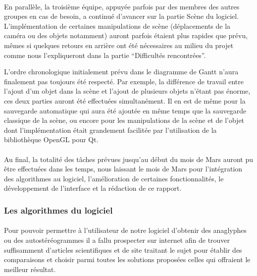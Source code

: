 \paragraph{}
En parallèle, la troisième équipe, appuyée parfois par des membres des autres groupes en cas de besoin, a continué d'avancer sur la partie Scène du logiciel. L'implémentation de certaines manipulations de scène (déplacements de la caméra ou des objets notamment) auront parfois étaient plus rapides que prévu, mêmes si quelques retours en arrière ont été nécessaires au milieu du projet comme nous l'expliqueront dans la partie ``Difficultés rencontrées''.

L'ordre chronologique initialement prévu dans le diagramme de Gantt n'aura finalement pas toujours été respecté. Par exemple, la différence de travail entre l'ajout d'un objet dans la scène et l'ajout de plusieurs objets n'étant pas énorme, ces deux parties auront été effectuées simultanément. Il en est de même pour la sauvegarde automatique qui aura été ajoutée en même temps que la sauvegarde classique de la scène, ou encore pour les manipulations de la scène et de l'objet dont l'implémentation était grandement facilitée par l'utilisation de la bibliothèque OpenGL pour Qt.

\paragraph{}
Au final, la totalité des tâches prévues jusqu'au début du mois de Mars auront pu être effectuées dans les temps, nous laissant le mois de Mars pour l'intégration des algorithmes au logiciel, l'amélioration de certaines fonctionnalités, le développement de l'interface et la rédaction de ce rapport.



\subsubsection{Les algorithmes du logiciel}
\paragraph{}
Pour pouvoir permettre à l'utilisateur de notre logiciel d'obtenir des anaglyphes ou des autostéréogrammes il a fallu prospecter sur internet afin de trouver suffisamment d'articles scientifiques et de site traitant le sujet pour établir des comparaisons et choisir parmi toutes les solutions proposées celles qui offraient le meilleur résultat.

